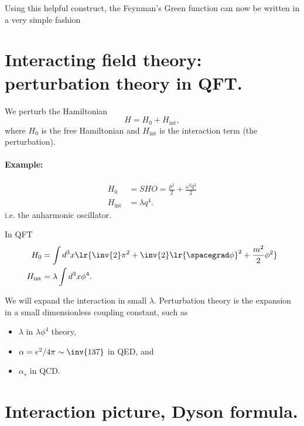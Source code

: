 Using this helpful construct, the Feynman's Green function can now be written in a very simple fashion

\section{Interacting field theory: perturbation theory in QFT.}

We perturb the Hamiltonian
\begin{dmath}\label{eqn:qftLecture13:500}
H = H_0 + H_{\text{int}},
\end{dmath}
where \( H_0 \) is the free Hamiltonian and \( H_{\text{int}} \) is the interaction term (the perturbation).

\paragraph{Example:}

\begin{equation}\label{eqn:qftLecture13:460}
\begin{aligned}
H_0 &= SHO = \frac{p^2}{2} + \frac{\omega^2 q^2}{2} \\
H_{\text{int}} &= \lambda q^4.
\end{aligned}
\end{equation}
i.e.  the anharmonic oscillator.

In QFT
\begin{dmath}\label{eqn:qftLecture13:480}
\begin{aligned}
H_0 &=
\int d^3 x \lr{ \inv{2} \pi^2 + \inv{2} \lr{ \spacegrad \phi}^2 + \frac{m^2}{2} \phi^2 } \\
H_{\text{int}} &=
\lambda \int d^3 x \phi^4.
\end{aligned}
\end{dmath}

We will expand the interaction in small \( \lambda \).  Perturbation theory is the expansion in a small dimensionless coupling constant, such as
\begin{itemize}
\item \( \lambda \) in \( \lambda \phi^4 \) theory,
\item \( \alpha = e^2/4 \pi \sim \inv{137} \) in QED, and
\item \( \alpha_s \) in QCD.
\end{itemize}

\section{Interaction picture, Dyson formula.}

